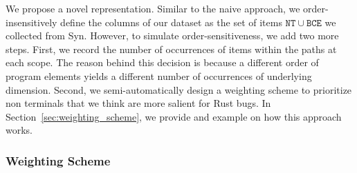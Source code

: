 We propose a novel representation. Similar to the naive approach, we order-insensitively define the columns of our dataset as the set of items $\mathtt{NT} \cup \mathtt{BCE}$ we collected from Syn. However, to simulate order-sensitiveness, we add two more steps. First, we record the number of occurrences of items within the paths at each scope. The reason behind this decision is because a different order of program elements yields a different number of occurrences of underlying dimension. Second, we semi-automatically design a weighting scheme to prioritize non terminals that we think are more salient for Rust bugs. In Section~\ref{sec:weighting_scheme}, we provide and example on how this approach works.

\subsubsection{\label{sec:weighting_scheme}Weighting Scheme}

